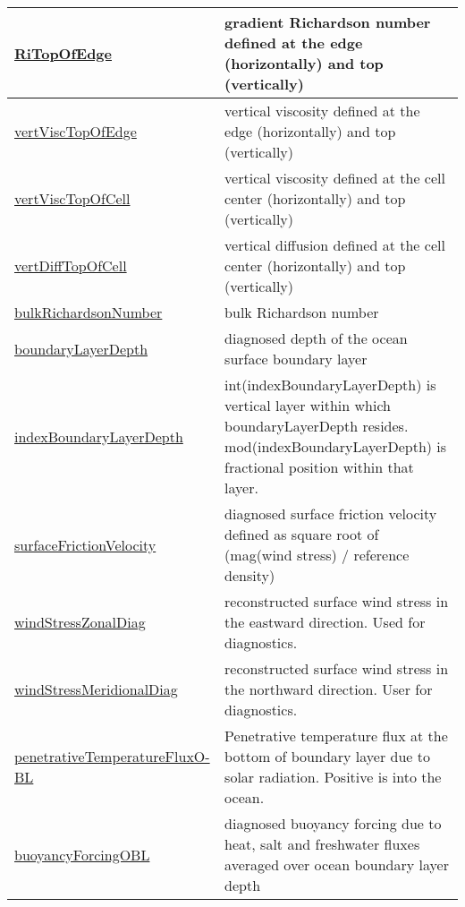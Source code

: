 {\begin{center}
\begin{longtable}{| p{2.0in} | p{4.0in} |}
	\hline
	\hyperref[subsec:var_sec_diagnostics_RiTopOfEdge]{RiTopOfEdge} & gradient Richardson number defined at the edge (horizontally) and top (vertically) \\
	\hline
	\hyperref[subsec:var_sec_diagnostics_vertViscTopOfEdge]{vertViscTopOfEdge} & vertical viscosity defined at the edge (horizontally) and top (vertically) \\
	\hline
	\hyperref[subsec:var_sec_diagnostics_vertViscTopOfCell]{vertViscTopOfCell} & vertical viscosity defined at the cell center (horizontally) and top (vertically) \\
	\hline
	\hyperref[subsec:var_sec_diagnostics_vertDiffTopOfCell]{vertDiffTopOfCell} & vertical diffusion defined at the cell center (horizontally) and top (vertically) \\
	\hline
	\hyperref[subsec:var_sec_diagnostics_bulkRichardsonNumber]{bulkRichardsonNumber} & bulk Richardson number \\
	\hline
	\hyperref[subsec:var_sec_diagnostics_boundaryLayerDepth]{boundaryLayerDepth} & diagnosed depth of the ocean surface boundary layer \\
	\hline
	\hyperref[subsec:var_sec_diagnostics_indexBoundaryLayerDepth]{indexBoundaryLayerDepth} & int(indexBoundaryLayerDepth) is vertical layer within which boundaryLayerDepth resides. mod(indexBoundaryLayerDepth) is fractional position within that layer. \\
	\hline
	\hyperref[subsec:var_sec_diagnostics_surfaceFrictionVelocity]{surfaceFrictionVelocity} & diagnosed surface friction velocity defined as square root of (mag(wind stress) / reference density) \\
	\hline
	\hyperref[subsec:var_sec_diagnostics_windStressZonalDiag]{windStressZonalDiag} & reconstructed surface wind stress in the eastward direction. Used for diagnostics. \\
	\hline
	\hyperref[subsec:var_sec_diagnostics_windStressMeridionalDiag]{windStressMeridionalDiag} & reconstructed surface wind stress in the northward direction. User for diagnostics. \\
	\hline
	\hyperref[subsec:var_sec_diagnostics_penetrativeTemperatureFluxOBL]{penetrativeTemperatureFluxO-}\hyperref[subsec:var_sec_diagnostics_penetrativeTemperatureFluxOBL]{BL  }& Penetrative temperature flux at the bottom of boundary layer due to solar radiation. Positive is into the ocean. \\
	\hline
	\hyperref[subsec:var_sec_diagnostics_buoyancyForcingOBL]{buoyancyForcingOBL} & diagnosed buoyancy forcing due to heat, salt and freshwater fluxes averaged over ocean boundary layer depth \\

\end{longtable}
\end{center}}
